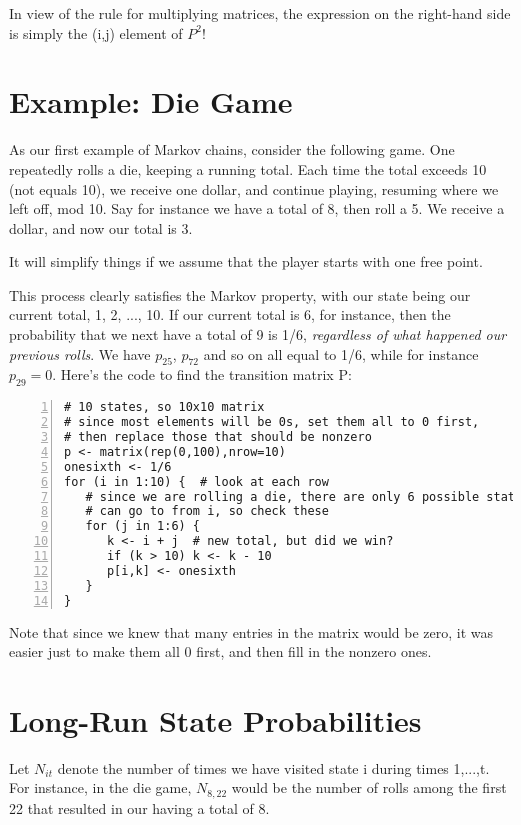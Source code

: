 In view of the rule for multiplying matrices, the expression on the
right-hand side is simply the (i,j) element of $P^2$!

\section{Example:  Die Game}

As our first example of Markov chains, consider the following game.  One
repeatedly rolls a die, keeping a running total.  Each time the total
exceeds 10 (not equals 10), we receive one dollar, and continue playing,
resuming where we left off, mod 10.  Say for instance we have a total of
8, then roll a 5.  We receive a dollar, and now our total is 3.

It will simplify things if we assume that the player starts with one
free point.

This process clearly satisfies the Markov property, with our state being
our current total, 1, 2, ..., 10.  If our current total is 6, for
instance, then the probability that we next have a total of 9 is 1/6,
{\it regardless of what happened our previous rolls}.  We have $p_{25}$,
$p_{72}$ and so on all equal to 1/6, while for instance $p_{29} = 0$.
Here's the code to find the transition matrix P:

\begin{lstlisting}[numbers=left]
# 10 states, so 10x10 matrix
# since most elements will be 0s, set them all to 0 first, 
# then replace those that should be nonzero
p <- matrix(rep(0,100),nrow=10)  
onesixth <- 1/6
for (i in 1:10) {  # look at each row
   # since we are rolling a die, there are only 6 possible states we 
   # can go to from i, so check these
   for (j in 1:6) {  
      k <- i + j  # new total, but did we win?
      if (k > 10) k <- k - 10 
      p[i,k] <- onesixth
   }
}
\end{lstlisting}

Note that since we knew that many entries in the matrix would be zero, it
was easier just to make them all 0 first, and then fill in the nonzero
ones.

\section{Long-Run State Probabilities}

Let $N_{it}$ denote the number of times we have visited state i during
times 1,...,t.  For instance, in the die game, $N_{8,22}$ would be the
number of rolls among the first 22 that resulted in our having a total
of 8.

